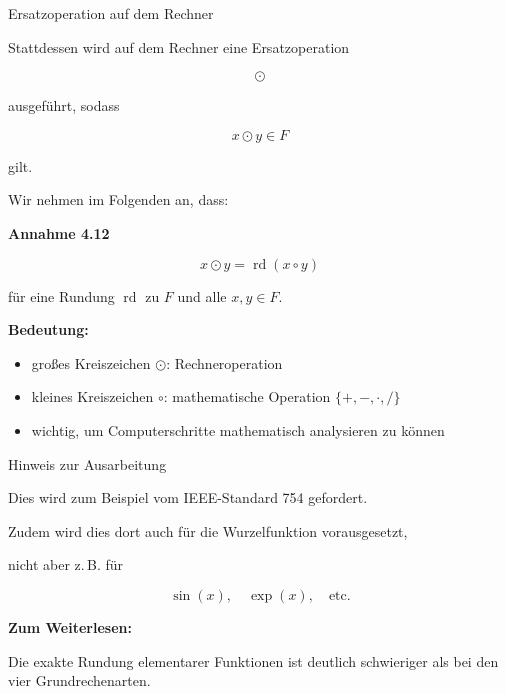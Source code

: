 \documentclass{beamer}
\begin{document}
\begin{frame}{Ersatzoperation auf dem Rechner}

\small

Stattdessen wird auf dem Rechner eine Ersatzoperation

\[
\odot
\]

ausgeführt, sodass

\[
x\odot y \in F
\]

gilt.

Wir nehmen im Folgenden an, dass:

\vspace{0.6cm}

\textbf{Annahme 4.12}

\[
x\odot y=\operatorname{rd}(x\circ y)
\]

für eine Rundung \(\operatorname{rd}\) zu \(F\) und alle \(x,y\in F\).

\vspace{0.6cm}

\textbf{Bedeutung:}

\begin{itemize}
\item großes Kreiszeichen \(\odot\): Rechneroperation
\item kleines Kreiszeichen \(\circ\): mathematische Operation \(\{+,-,\cdot,/\}\)
\item wichtig, um Computerschritte mathematisch analysieren zu können
\end{itemize}

\end{frame}

\begin{frame}{Hinweis zur Ausarbeitung}

\small

Dies wird zum Beispiel vom IEEE-Standard 754 gefordert.

\vspace{0.5cm}

Zudem wird dies dort auch für die Wurzelfunktion vorausgesetzt,

nicht aber z.\,B. für

\[
\sin(x),\quad \exp(x),\quad \text{etc.}
\]

\vspace{0.8cm}

\textbf{Zum Weiterlesen:}

Die exakte Rundung elementarer Funktionen ist deutlich schwieriger
als bei den vier Grundrechenarten.

\end{frame}
\end{document}
